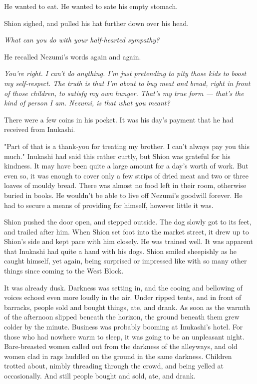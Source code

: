 He wanted to eat. He wanted to sate his empty stomach.

Shion sighed, and pulled his hat further down over his head.

\emph{What can you do with your half-hearted sympathy?}

He recalled Nezumi's words again and again.

\emph{You're right. I can't do anything. I'm just pretending to pity those
kids to boost my self-respect. The truth is that I'm about to buy meat
and bread, right in front of those children, to satisfy my own hunger.
That's my true form --- that's the kind of person I am. Nezumi, is that
what you meant?}

There were a few coins in his pocket. It was his day's payment that he
had received from Inukashi.

"Part of that is a thank-you for treating my brother. I can't always pay
you this much." Inukashi had said this rather curtly, but Shion was
grateful for his kindness. It may have been quite a large amount for a
day's worth of work. But even so, it was enough to cover only a few
strips of dried meat and two or three loaves of mouldy bread. There was
almost no food left in their room, otherwise buried in books. He
wouldn't be able to live off Nezumi's goodwill forever. He had to secure
a means of providing for himself, however little it was.

Shion pushed the door open, and stepped outside. The dog slowly got to
its feet, and trailed after him. When Shion set foot into the market
street, it drew up to Shion's side and kept pace with him closely. He
was trained well. It was apparent that Inukashi had quite a hand with
his dogs. Shion smiled sheepishly as he caught himself, yet again, being
surprised or impressed like with so many other things since coming to
the West Block.

It was already dusk. Darkness was setting in, and the cooing and
bellowing of voices echoed even more loudly in the air. Under ripped
tents, and in front of barracks, people sold and bought things, ate, and
drank. As soon as the warmth of the afternoon slipped beneath the
horizon, the ground beneath them grew colder by the minute. Business was
probably booming at Inukashi's hotel. For those who had nowhere warm to
sleep, it was going to be an unpleasant night. Bare-breasted women
called out from the darkness of the alleyways, and old women clad in
rags huddled on the ground in the same darkness. Children trotted about,
nimbly threading through the crowd, and being yelled at occasionally.
And still people bought and sold, ate, and drank.


